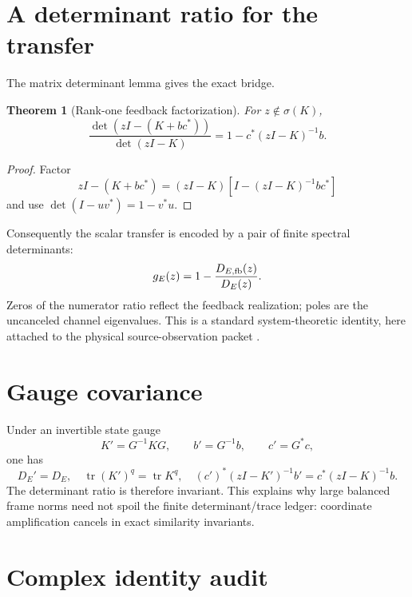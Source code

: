 \documentclass[12pt]{article}
\newtheorem{theorem}{Theorem}[section]
\theoremstyle{remark}
\begin{document}
\section{A determinant ratio for the transfer}

The matrix determinant lemma gives the exact bridge.

\begin{theorem}[Rank-one feedback factorization]\label{thm:feedback}
For $z\notin\sigma(K)$,
\begin{equation}\label{eq:feedback}
 \boxed{
 \frac{\det(zI-(K+bc^*))}{\det(zI-K)}
 =1-c^*(zI-K)^{-1}b.
 }
\end{equation}
\end{theorem}

\begin{proof}
Factor
\[
 zI-(K+bc^*)=(zI-K)
 \left[I-(zI-K)^{-1}bc^*\right]
\]
and use $\det(I-uv^*)=1-v^*u$.
\end{proof}

Consequently the scalar transfer is encoded by a pair of finite spectral
determinants:
\begin{equation}\label{eq:transfer-pair}
 g_E(z)=1-\frac{D_{E,\rm fb}(z)}{D_E(z)}.
\end{equation}
Zeros of the numerator ratio reflect the feedback realization; poles are
the uncanceled channel eigenvalues.  This is a standard system-theoretic
identity, here attached to the physical source-observation packet
\citep{Kailath1980}.

\section{Gauge covariance}

Under an invertible state gauge
\begin{equation}\label{eq:gauge}
 K'=G^{-1}KG,
 \qquad b'=G^{-1}b,
 \qquad c'=G^*c,
\end{equation}
one has
\begin{equation}\label{eq:gauge-invariance}
 D_E'=D_E,
 \quad \operatorname{tr}(K')^q=\operatorname{tr}K^q,
 \quad (c')^*(zI-K')^{-1}b'=c^*(zI-K)^{-1}b.
\end{equation}
The determinant ratio is therefore invariant.  This explains why large
balanced frame norms need not spoil the finite determinant/trace ledger:
coordinate amplification cancels in exact similarity invariants.

\section{Complex identity audit}
\end{document}
